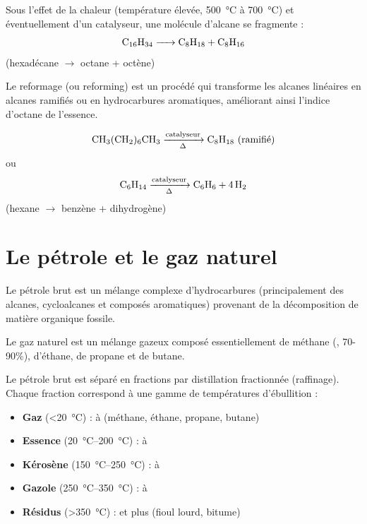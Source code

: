 \begin{propriete}
Sous l'effet de la chaleur (température élevée, \SI{500}{\celsius} à \SI{700}{\celsius}) et éventuellement d'un catalyseur, une molécule d'alcane se fragmente :
\[
\ce{C16H34 -> C8H18 + C8H16}
\]
(hexadécane $\rightarrow$ octane + octène)
\end{propriete}

\begin{definition}[Reformage]
Le reformage (ou reforming) est un procédé qui transforme les alcanes linéaires en alcanes ramifiés ou en hydrocarbures aromatiques, améliorant ainsi l'indice d'octane de l'essence.
\end{definition}

\begin{exemple}[Reformage]
\[
\ce{CH3(CH2)6CH3 ->[catalyseur][\Delta] C8H18\text{ (ramifié)}}
\]
ou
\[
\ce{C6H14 ->[catalyseur][\Delta] C6H6 + 4 H2}
\]
(hexane $\rightarrow$ benzène + dihydrogène)
\end{exemple}

\section{Le pétrole et le gaz naturel}

\begin{definition}
Le pétrole brut est un mélange complexe d'hydrocarbures (principalement des alcanes, cycloalcanes et composés aromatiques) provenant de la décomposition de matière organique fossile.
\end{definition}

\begin{definition}
Le gaz naturel est un mélange gazeux composé essentiellement de méthane (, 70-90\%), d'éthane, de propane et de butane.
\end{definition}

\begin{propriete}
Le pétrole brut est séparé en fractions par distillation fractionnée (raffinage). Chaque fraction correspond à une gamme de températures d'ébullition :
\begin{itemize}
    \item \textbf{Gaz} (\SI{<20}{\celsius}) :  à  (méthane, éthane, propane, butane)
    \item \textbf{Essence} (\SIrange{20}{200}{\celsius}) :  à 
    \item \textbf{Kérosène} (\SIrange{150}{250}{\celsius}) :  à 
    \item \textbf{Gazole} (\SIrange{250}{350}{\celsius}) :  à 
    \item \textbf{Résidus} (\SI{>350}{\celsius}) :  et plus (fioul lourd, bitume)
\end{itemize}
\end{propriete}

